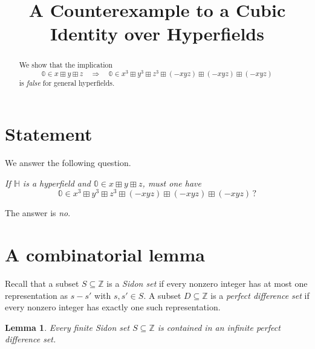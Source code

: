 \documentclass[11pt]{article}
\newtheorem{lemma}[theorem]{Lemma}
\newcommand{\hz}{\mathbb{0}}
\begin{document}
\title{A Counterexample to a Cubic Identity over Hyperfields}
\author{}
\date{}
\maketitle

\begin{abstract}
We show that the implication
\[
\hz \in x\boxplus y\boxplus z
\quad\Longrightarrow\quad
\hz \in x^3\boxplus y^3\boxplus z^3\boxplus (-xyz)\boxplus(-xyz)\boxplus(-xyz)
\]
is \emph{false} for general hyperfields.
\end{abstract}

\section*{Statement}

We answer the following question.

\medskip

\noindent
\emph{If $\mathbb H$ is a hyperfield and $\hz \in x\boxplus y\boxplus z$, must one have}
\[
\hz \in x^3\boxplus y^3\boxplus z^3\boxplus (-xyz)\boxplus(-xyz)\boxplus(-xyz)\, ?
\]

\medskip

\noindent
The answer is \emph{no}.

\section*{A combinatorial lemma}

Recall that a subset $S\subseteq \mathbb Z$ is a \emph{Sidon set} if every nonzero integer has at most one representation as $s-s'$ with $s,s'\in S$. A subset $D\subseteq \mathbb Z$ is a \emph{perfect difference set} if every nonzero integer has exactly one such representation.

\begin{lemma}\label{lem:extend}
Every finite Sidon set $S\subseteq \mathbb Z$ is contained in an infinite perfect difference set.
\end{lemma}
\end{document}
